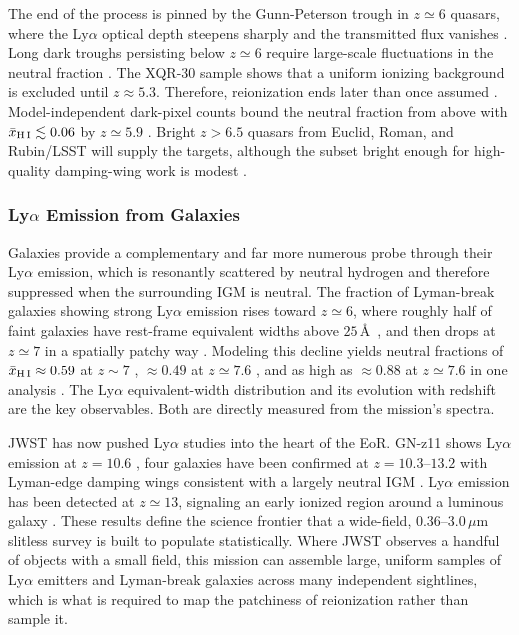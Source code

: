 \documentclass[10pt,onecolumn]{article}
\begin{document}
The end of the process is pinned by the Gunn-Peterson trough in $z\simeq6$ quasars, where the Ly$\alpha$ optical depth steepens sharply and the transmitted flux vanishes \cite{fan2006}. Long dark troughs persisting below $z\simeq6$ require large-scale fluctuations in the neutral fraction \cite{becker2015}. The XQR-30 sample shows that a uniform ionizing background is excluded until $z\approx5.3$. Therefore, reionization ends later than once assumed \cite{bosman2022}. Model-independent dark-pixel counts bound the neutral fraction from above with $\bar{x}_{\rm H\,I}\lesssim0.06$ by $z\simeq5.9$ \cite{mcgreer2015}. Bright $z>6.5$ quasars from Euclid, Roman, and Rubin/LSST will supply the targets, although the subset bright enough for high-quality damping-wing work is modest \cite{mortlock2024}.

\subsubsection{Ly$\alpha$ Emission from Galaxies}

Galaxies provide a complementary and far more numerous probe through their Ly$\alpha$ emission, which is resonantly scattered by neutral hydrogen and therefore suppressed when the surrounding IGM is neutral. The fraction of Lyman-break galaxies showing strong Ly$\alpha$ emission rises toward $z\simeq6$, where roughly half of faint galaxies have rest-frame equivalent widths above $25$\,\AA\ \cite{stark2010,stark2011}, and then drops at $z\simeq7$ in a spatially patchy way \cite{pentericci2014}. Modeling this decline yields neutral fractions of $\bar{x}_{\rm H\,I}\approx0.59$ at $z\sim7$ \cite{mason2018}, $\approx0.49$ at $z\simeq7.6$ \cite{jung2020}, and as high as $\approx0.88$ at $z\simeq7.6$ in one analysis \cite{hoag2019}. The Ly$\alpha$ equivalent-width distribution and its evolution with redshift are the key observables. Both are directly measured from the mission's spectra.

JWST has now pushed Ly$\alpha$ studies into the heart of the EoR. GN-z11 shows Ly$\alpha$ emission at $z=10.6$ \cite{bunker2023}, four galaxies have been confirmed at $z=10.3$--$13.2$ with Lyman-edge damping wings consistent with a largely neutral IGM \cite{curtislake2023}. Ly$\alpha$ emission has been detected at $z\simeq13$, signaling an early ionized region around a luminous galaxy \cite{witstok2025}. These results define the science frontier that a wide-field, $0.36$--$3.0\,\mu$m slitless survey is built to populate statistically. Where JWST observes a handful of objects with a small field, this mission can assemble large, uniform samples of Ly$\alpha$ emitters and Lyman-break galaxies across many independent sightlines, which is what is required to map the patchiness of reionization rather than sample it.
\end{document}
